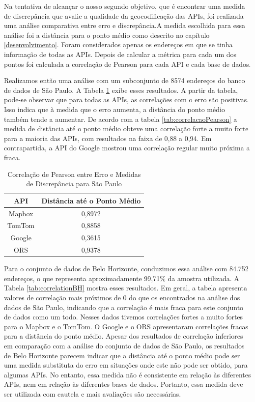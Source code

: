 Na tentativa de alcançar o nosso segundo objetivo, que é encontrar uma medida de discrepância que avalie a qualidade da geocodificação das APIs, foi realizada uma análise comparativa entre erro e discrepância.A medida escolhida para essa análise foi a distância para o ponto médio como descrito no capítulo \ref{desenvolvimento}. Foram considerados apenas os endereços em que se tinha informação de todas as APIs. Depois de calcular a métrica para cada um dos pontos foi calculada a correlação de Pearson para cada API e cada base de dados.  

Realizamos então uma análise com um subconjunto de 8574 endereços do banco de dados de São Paulo. A Tabela \ref{tab:correlationSP} exibe esses resultados. A partir da tabela, pode-se observar que para todas as APIs, as correlações com o erro são positivas. Isso indica que à medida que o erro aumenta, a distância do ponto médio também tende a aumentar. De acordo com a tabela \ref{tab:correlacaoPearson} a medida de distância até o ponto médio obteve uma correlação forte a muito forte para a maioria das APIs, com resultados na faixa de 0,88 a 0,94. Em contrapartida, a API do Google mostrou uma correlação regular muito próxima a fraca.

\begin{table}[h]
  \centering
  \caption{Correlação de Pearson entre Erro e Medidas de Discrepância para São Paulo}
  \label{tab:correlationSP}
  \begin{tabular}{|c|c|}
  \hline
  API & Distância até o Ponto Médio \\
  \hline
  Mapbox & 0,8972 \\
  TomTom & 0,8858 \\
  Google & 0,3615 \\
  ORS & 0,9378 \\
  \hline
  \end{tabular}
\end{table}

Para o conjunto de dados de Belo Horizonte, conduzimos essa análise com 84.752 endereços, o que representa aproximadamente 99,71\% da amostra utilizada. A Tabela \ref{tab:correlationBH} mostra esses resultados. Em geral, a tabela apresenta valores de correlação mais próximos de 0 do que os encontrados na análise dos dados de São Paulo, indicando que a correlação é mais fraca para este conjunto de dados como um todo. Nesses dados tivemos correlações fortes a muito fortes para o Mapbox e o TomTom. O Google e o ORS apresentaram correlações fracas para a distância do ponto médio. Apesar dos resultados de correlação inferiores em comparação com a análise do conjunto de dados de São Paulo, os resultados de Belo Horizonte parecem indicar que a distância até o ponto médio pode ser uma medida substituta do erro em situações onde este não pode ser obtido, para algumas APIs. No entanto, essa medida não é consistente em relação às diferentes APIs, nem em relação às diferentes bases de dados. Portanto, essa medida deve ser utilizada com cautela e mais avaliações são necessárias.

